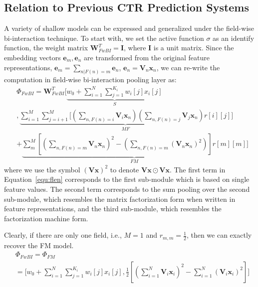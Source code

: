 \documentclass[sigconf]{acmart}
\begin{document}
\subsection{Relation to Previous CTR Prediction Systems}
A variety of shallow models can be expressed and generalized under the field-wise bi-interaction technique. 
To start with, we set the active function $\sigma$ as an identify function, the weight matrix $\mathbf{W}_{FwBI}^T=\mathbf{I}$, where $\mathbf{I}$ is a unit matrix. 
Since the embedding vectors $\mathbf{e}_m,\mathbf{e}_n$ are transformed from the original feature representations, $\mathbf{e}_m=\sum_{n|F(n)=m} \mathbf{e}_{n}$, $\mathbf{e}_n = \mathbf{V}_{n}\mathbf{x}_n$, we can re-write the computation in field-wise bi-interaction pooling layer as: 
\begin{equation}\label{equ:flen}\begin{split}
&	\Phi_{FwBI}= \mathbf{W}_{FwBI}^T\Big[\underbrace{w_0+\sum_{i=1}^{N}\sum_{j=1}^{K_i} w_{i}[j] x_{i}[j] } _{\textit{S}} \\
&	 , \underbrace{\sum_{i=1}^{M} \sum_{j=i+1}^{M}\big[(\sum_{n,F(n)=i } \mathbf{V}_{i} \mathbf{x}_n)(\sum_{n, F(n)=j } \mathbf{V}_{j} \mathbf{x}_n) r[i][j]}_{\textit{MF}}\big] \\
&	 + \underbrace{ \sum_{m}^M [(\sum_{n, F(n)=m } \mathbf{V}_{n} \mathbf{x}_n)^2-( \sum_{n,F(n)=m} (\mathbf{V}_{n} \mathbf{x}_n)^2)] r[m][m]}_{\textit{FM}}\Big]
\end{split}
\end{equation}   
where we use the symbol $(\mathbf{Vx})^2$ to denote $\mathbf{Vx}\odot \mathbf{Vx}$. The first term in Equation~\ref{equ:flen} corresponds to the first sub-module which is based on single feature values. The second term corresponds to the sum pooling over the second sub-module, which resembles the matrix factorization form when written in feature representations, and the third sub-module, which resembles the factorization machine form.  


Clearly, if there are only one field, i.e., $M=1$ and $r_{m, m}=\frac{1}{2}$, then we can exactly recover the FM model.
\begin{equation}\label{eq:fm}
\begin{split}
&	\Phi_{FwBI}=\Phi_{FM}\\
&=\Big[w_0 + \sum_{i=1}^{N}\sum_{j=1}^{K_i} w_{i}[j] x_{i}[j], \frac{1}{2}[(\sum_{i=1}^N \mathbf{V}_i\mathbf{x}_i)^2-\sum_{i=1}^N(\mathbf{V}_i\mathbf{x}_i)^2]\Big]
\end{split}
\end{equation}   
\end{document}
